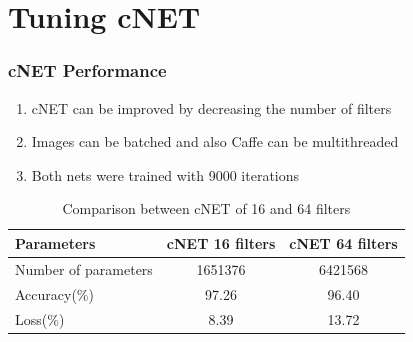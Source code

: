 \documentclass[10pt,a4paper]{beamer}
\begin{document}
\section{Tuning cNET}
\begin{frame}
\frametitle{cNET Performance}
\begin{enumerate}
\item cNET can be improved by decreasing the number of filters
\item Images can be batched and also Caffe can be multithreaded
\item Both nets were trained with 9000 iterations
\end{enumerate}
\begin{table}[h]
\centering
\renewcommand{\arraystretch}{1.2}
\caption{Comparison between cNET of 16 and 64 filters}
\label{table:3}
\begin{tabular}{|l c c |} 
 \hline
 \textbf{Parameters} & \textbf{cNET 16 filters} & \textbf{cNET 64 filters} \\ [0.75ex] 
 \hline
 Number of parameters & 1651376 & 6421568 \\ 
 Accuracy(\%) & 97.26 & 96.40 \\
 Loss(\%) & 8.39 & 13.72 \\ [1ex] 
 \hline 
\end{tabular}
\end{table}
\end{frame}
\end{document}
